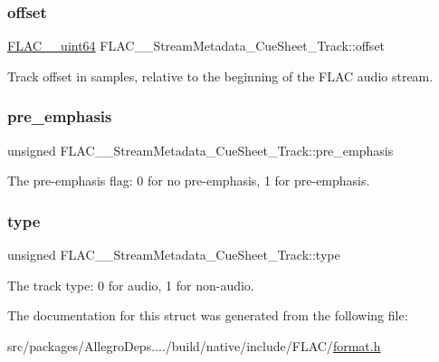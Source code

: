 \subsubsection{\texorpdfstring{offset}{offset}}
{\footnotesize\ttfamily \hyperlink{ordinals_8h_aa78c8c70a3eb8a58af7436f278acde8e}{F\+L\+A\+C\+\_\+\+\_\+uint64} F\+L\+A\+C\+\_\+\+\_\+\+Stream\+Metadata\+\_\+\+Cue\+Sheet\+\_\+\+Track\+::offset}

Track offset in samples, relative to the beginning of the F\+L\+AC audio stream. \mbox{\label{struct_f_l_a_c_____stream_metadata___cue_sheet___track_ab4a97e43166ee16d1d16cccd901ddc3a}} 
\subsubsection{\texorpdfstring{pre\+\_\+emphasis}{pre\_emphasis}}
{\footnotesize\ttfamily unsigned F\+L\+A\+C\+\_\+\+\_\+\+Stream\+Metadata\+\_\+\+Cue\+Sheet\+\_\+\+Track\+::pre\+\_\+emphasis}

The pre-\/emphasis flag\+: 0 for no pre-\/emphasis, 1 for pre-\/emphasis. \mbox{\label{struct_f_l_a_c_____stream_metadata___cue_sheet___track_a848575fc7a7292867ce76a9b3705f6e7}} 
\subsubsection{\texorpdfstring{type}{type}}
{\footnotesize\ttfamily unsigned F\+L\+A\+C\+\_\+\+\_\+\+Stream\+Metadata\+\_\+\+Cue\+Sheet\+\_\+\+Track\+::type}

The track type\+: 0 for audio, 1 for non-\/audio. 

The documentation for this struct was generated from the following file\+:\begin{DoxyCompactItemize}
\item 
src/packages/\+Allegro\+Deps..../build/native/include/\+F\+L\+A\+C/\hyperlink{format_8h}{format.\+h}\end{DoxyCompactItemize}
